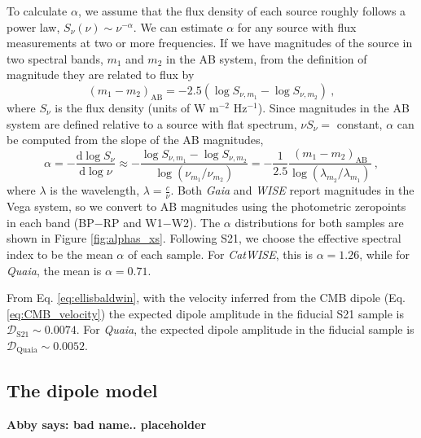 \documentclass[modern]{aastex631}
\newcommand{\abby}[1]{\textbf{Abby says: #1}}
\newcommand{\catwise}{\textsl{CatWISE}\xspace}
\newcommand{\quaia}{\textsl{Quaia}\xspace}
\newcommand{\gaia}{\textsl{Gaia}\xspace}
\newcommand{\wise}{\textsl{WISE}\xspace}
\newcommand{\dd}{\mathrm{d}}
\begin{document}
To calculate $\alpha$, we assume that the flux density of each source roughly follows a power law, $S_\nu(\nu)\sim\nu^{-\alpha}$.
We can estimate $\alpha$ for any source with flux measurements at two or more frequencies.
If we have magnitudes of the source in two spectral bands, $m_1$ and $m_2$ in the AB system, from the definition of magnitude they are related to flux by
\begin{equation}
    (m_1-m_2)_\mathrm{AB}=-2.5(\log S_{\nu,m_1}-\log S_{\nu,m_2}) ~,
\end{equation}
where $S_{\nu}$ is the flux density (units of W m$^{-2}$ Hz$^{-1}$).
Since magnitudes in the AB system are defined relative to a source with flat spectrum, $\nu S_\nu=$ constant, $\alpha$ can be computed from the slope of the AB magnitudes,
\begin{equation}
    \alpha = -\frac{\dd\log S_\nu}{\dd\log\nu} \approx -\frac{\log S_{\nu,m_1}-\log S_{\nu,m_2}}{\log\left(\nu_{m_1}/\nu_{m_2}\right)} = -\frac{1}{2.5}\frac{(m_1-m_2)_{\mathrm{AB}}}{\log(\lambda_{m_2}/\lambda_{m_1})} ~,
\end{equation}
where $\lambda$ is the wavelength, $\lambda=\frac{c}{\nu}$.
Both \gaia and \wise report magnitudes in the Vega system, so we convert to AB magnitudes using the photometric zeropoints in each band (BP$-$RP and W1$-$W2).
The $\alpha$ distributions for both samples are shown in Figure \ref{fig:alphas_xs}.
Following S21, we choose the effective spectral index to be the mean $\alpha$ of each sample.
For \catwise, this is $\alpha=1.26$, while for \quaia, the mean is $\alpha=0.71$.

From Eq. \ref{eq:ellisbaldwin}, with the velocity inferred from the CMB dipole (Eq. \ref{eq:CMB_velocity}) the expected dipole amplitude in the fiducial S21 sample is $\mathcal{D}_\mathrm{S21}\sim 0.0074$.
For \quaia, the expected dipole amplitude in the fiducial sample is $\mathcal{D}_\mathrm{Quaia}\sim 0.0052$.

\subsection{The dipole model}
\label{sec:dipole_model}

\abby{bad name.. placeholder}
\end{document}
